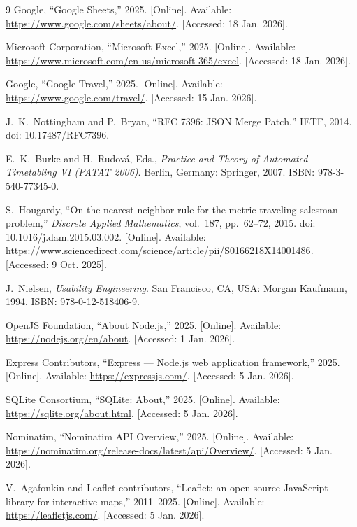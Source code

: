 \documentclass[pdftex,10pt,a4paper,oneside]{article}
\numberwithin{equation}{section} %
\begin{document}
\begin{thebibliography}{9}
Google, ``Google Sheets,'' 2025. [Online]. Available: \url{https://www.google.com/sheets/about/}. [Accessed: 18 Jan. 2026].

Microsoft Corporation, ``Microsoft Excel,'' 2025. [Online]. Available: \url{https://www.microsoft.com/en-us/microsoft-365/excel}. [Accessed: 18 Jan. 2026].

Google, ``Google Travel,'' 2025. [Online]. Available: \url{https://www.google.com/travel/}. [Accessed: 15 Jan. 2026].

J.~K.~Nottingham and P.~Bryan, ``RFC 7396: JSON Merge Patch,'' IETF, 2014. doi: 10.17487/RFC7396.

E.~K.~Burke and H.~Rudov\'a, Eds., \emph{Practice and Theory of Automated Timetabling VI (PATAT 2006)}. Berlin, Germany: Springer, 2007. ISBN: 978-3-540-77345-0.

S.~Hougardy, ``On the nearest neighbor rule for the metric traveling salesman problem,'' \emph{Discrete Applied Mathematics}, vol.~187, pp.~62--72, 2015. doi: 10.1016/j.dam.2015.03.002. [Online]. Available: \url{https://www.sciencedirect.com/science/article/pii/S0166218X14001486}. [Accessed: 9 Oct. 2025].

J.~Nielsen, \emph{Usability Engineering}. San Francisco, CA, USA: Morgan Kaufmann, 1994. ISBN: 978-0-12-518406-9.

OpenJS Foundation, ``About Node.js,'' 2025. [Online]. Available: \url{https://nodejs.org/en/about}. [Accessed: 1 Jan. 2026].

Express Contributors, ``Express --- Node.js web application framework,'' 2025. [Online]. Available: \url{https://expressjs.com/}. [Accessed: 5 Jan. 2026].

SQLite Consortium, ``SQLite: About,'' 2025. [Online]. Available: \url{https://sqlite.org/about.html}. [Accessed: 5 Jan. 2026].

Nominatim, ``Nominatim API Overview,'' 2025. [Online]. Available: \url{https://nominatim.org/release-docs/latest/api/Overview/}. [Accessed: 5 Jan. 2026].

V.~Agafonkin and Leaflet contributors, ``Leaflet: an open-source JavaScript library for interactive maps,'' 2011--2025. [Online]. Available: \url{https://leafletjs.com/}. [Accessed: 5 Jan. 2026].


\end{thebibliography}
\end{document}
